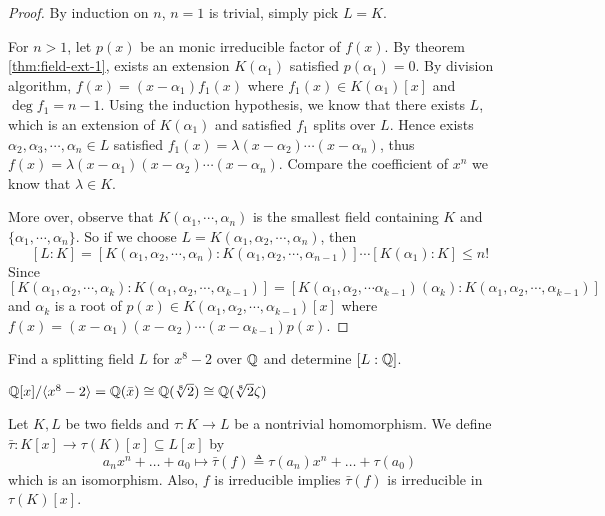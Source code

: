 \begin{proof}
  By induction on $n$, $n = 1$ is trivial, simply pick $L = K$.

  For $n > 1$, let $p(x)$ be an monic irreducible factor of $f(x)$.
  By theorem \ref{thm:field-ext-1}, exists an extension $K(\alpha_1)$ satisfied $p(\alpha_1) = 0$.
  By division algorithm, $f(x) = (x - \alpha_1) f_1(x)$ where $f_1(x) \in K(\alpha_1)[x]$
  and $\deg f_1 = n - 1$. Using the induction hypothesis, we know that there exists $L$,
  which is an extension of $K(\alpha_1)$ and satisfied $f_1$
  splits over $L$. Hence exists $\alpha_2, \alpha_3, \cdots, \alpha_n \in L$ satisfied
  $ f_1(x) = \lambda (x - \alpha_2) \cdots (x - \alpha_n)$,
  thus $f(x) = \lambda (x - \alpha_1) (x - \alpha_2) \cdots (x - \alpha_n)$. Compare the
  coefficient of $x^n$ we know that $\lambda \in K$.

  More over, observe that $K(\alpha_1, \cdots, \alpha_n)$ is the smallest field containing $K$ and
  $\{ \alpha_1, \cdots, \alpha_n\}$. So if we choose $L = K(\alpha_1, \alpha_2, \cdots, \alpha_n)$,
  then
  \[ [L: K] = [K(\alpha_1, \alpha_2, \cdots, \alpha_n): K(\alpha_1, \alpha_2, \cdots, \alpha_{n-1})]
    \cdots
    [K(\alpha_1): K] \leq n! \]
  Since $[K(\alpha_1, \alpha_2, \cdots, \alpha_k): K(\alpha_1, \alpha_2, \cdots, \alpha_{k-1})]
  = [K(\alpha_1, \alpha_2, \cdots \alpha_{k-1})(\alpha_k): K(\alpha_1, \alpha_2, \cdots, \alpha_{k-1})]$
  and $\alpha_k$ is a root of $p(x) \in K(\alpha_1, \alpha_2, \cdots, \alpha_{k-1})[x]$
  where $f(x) = (x - \alpha_1)(x - \alpha_2) \cdots (x - \alpha_{k-1}) p(x)$.
\end{proof}

\begin{example}
  Find a splitting field $L$ for $x^8 - 2$ over $\mathbb{Q}$ and determine $[L : \mathbb{Q}]$.
\end{example}

\begin{remark}
  ${\mathbb{Q}[x]}/{\langle x^8 - 2\rangle} = \mathbb{Q}(\bar{x}) \cong \mathbb{Q}(\sqrt[8]{2})
  \cong \mathbb{Q}(\sqrt[8]{2} \zeta)$
\end{remark}

\begin{prop} \label{prop:after-homo-still-irr}
  Let $K, L$ be two fields and $\tau: K \to L$ be a nontrivial homomorphism.
  We define $\bar\tau : K[x] \to \tau(K)[x] \subseteq L[x]$ by
  \[ a_n x^n + \ldots + a_0 \mapsto \bar\tau(f) \triangleq \tau(a_n)x^n + \ldots + \tau(a_0) \]
  which is an isomorphism. Also, $f$ is irreducible implies $\bar\tau(f)$ is irreducible in $\tau(K)[x]$.
\end{prop}

